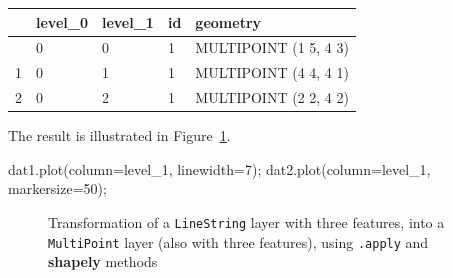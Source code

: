 \documentclass[
  letterpaper,
]{krantz}
\newenvironment{Shaded}{\begin{snugshade}}{\end{snugshade}}
\newcommand{\DecValTok}[1]{\textcolor[rgb]{0.68,0.00,0.00}{#1}}
\newcommand{\NormalTok}[1]{\textcolor[rgb]{0.00,0.23,0.31}{#1}}
\newcommand{\OperatorTok}[1]{\textcolor[rgb]{0.37,0.37,0.37}{#1}}
\newcommand{\StringTok}[1]{\textcolor[rgb]{0.13,0.47,0.30}{#1}}
\begin{document}
\begin{longtable}[]{@{}lllll@{}}
\toprule\noalign{}
& level\_0 & level\_1 & id & geometry \\
\midrule\noalign{}
\endhead
\bottomrule\noalign{}
\endlastfoot
0 & 0 & 0 & 1 & MULTIPOINT (1 5, 4 3) \\
1 & 0 & 1 & 1 & MULTIPOINT (4 4, 4 1) \\
2 & 0 & 2 & 1 & MULTIPOINT (2 2, 4 2) \\
\end{longtable}

The result is illustrated in Figure~\ref{fig-linestring-to-multipoint}.

\begin{Shaded}
\begin{Highlighting}[]
\NormalTok{dat1.plot(column}\OperatorTok{=}\StringTok{\textquotesingle{}level\_1\textquotesingle{}}\NormalTok{, linewidth}\OperatorTok{=}\DecValTok{7}\NormalTok{)}\OperatorTok{;}
\NormalTok{dat2.plot(column}\OperatorTok{=}\StringTok{\textquotesingle{}level\_1\textquotesingle{}}\NormalTok{, markersize}\OperatorTok{=}\DecValTok{50}\NormalTok{)}\OperatorTok{;}
\end{Highlighting}
\end{Shaded}

\begin{figure}

\begin{minipage}{0.50\linewidth}



\end{minipage}%
%
\begin{minipage}{0.50\linewidth}



\end{minipage}%

\caption{\label{fig-linestring-to-multipoint}Transformation of a
\texttt{\textquotesingle{}LineString\textquotesingle{}} layer with three
features, into a \texttt{\textquotesingle{}MultiPoint\textquotesingle{}}
layer (also with three features), using \texttt{.apply} and
\textbf{shapely} methods}

\end{figure}%
\end{document}
